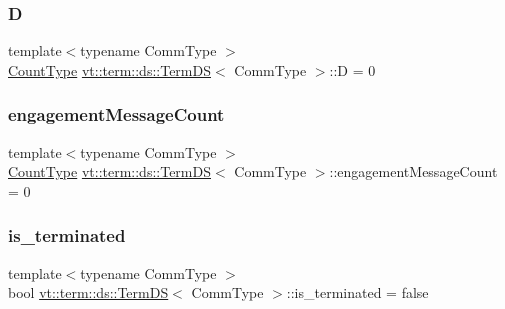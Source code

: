 \mbox{\label{structvt_1_1term_1_1ds_1_1_term_d_s_afcfe54a5e5844f7483cd730c9970fe36}} 
\subsubsection{\texorpdfstring{D}{D}}
{\footnotesize\ttfamily template$<$typename Comm\+Type $>$ \\
\hyperlink{structvt_1_1term_1_1ds_1_1_term_d_s_a54f4ebd7e1ecb59c32c0f5b03ef9f20b}{Count\+Type} \hyperlink{structvt_1_1term_1_1ds_1_1_term_d_s}{vt\+::term\+::ds\+::\+Term\+DS}$<$ Comm\+Type $>$\+::D = 0\hspace{0.3cm}{\ttfamily [protected]}}

\mbox{\label{structvt_1_1term_1_1ds_1_1_term_d_s_ad8d11aea5b48de393ba6f94c0ce8ed7e}} 
\subsubsection{\texorpdfstring{engagement\+Message\+Count}{engagementMessageCount}}
{\footnotesize\ttfamily template$<$typename Comm\+Type $>$ \\
\hyperlink{structvt_1_1term_1_1ds_1_1_term_d_s_a54f4ebd7e1ecb59c32c0f5b03ef9f20b}{Count\+Type} \hyperlink{structvt_1_1term_1_1ds_1_1_term_d_s}{vt\+::term\+::ds\+::\+Term\+DS}$<$ Comm\+Type $>$\+::engagement\+Message\+Count = 0\hspace{0.3cm}{\ttfamily [protected]}}

\mbox{\label{structvt_1_1term_1_1ds_1_1_term_d_s_af53bdb81804df4d07dc7fd647329a89a}} 
\subsubsection{\texorpdfstring{is\+\_\+terminated}{is\_terminated}}
{\footnotesize\ttfamily template$<$typename Comm\+Type $>$ \\
bool \hyperlink{structvt_1_1term_1_1ds_1_1_term_d_s}{vt\+::term\+::ds\+::\+Term\+DS}$<$ Comm\+Type $>$\+::is\+\_\+terminated = false}


